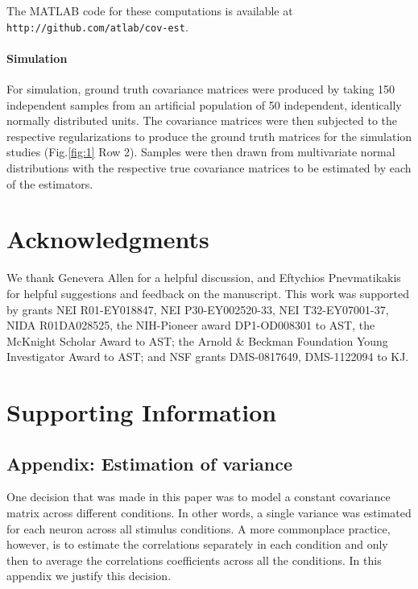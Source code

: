 \documentclass[10pt]{article}
\newcommand{\figref}[2]{Fig.\;\ref{fig:#1}\,#2}
\begin{document}
The MATLAB code for these computations is available at {\tt http://github.com/atlab/cov-est}.

\paragraph{Simulation}
For simulation, ground truth covariance matrices were produced by taking 150 independent samples from an artificial population of 50 independent, identically normally distributed units. The covariance matrices were then subjected to the respective regularizations to produce the ground truth matrices for the simulation studies (\figref{1}{\,Row 2}). Samples were then drawn from multivariate normal distributions with the respective true covariance matrices to be estimated by each of the estimators. 

\section*{Acknowledgments}
We thank Genevera Allen for a helpful discussion, and Eftychios Pnevmatikakis for helpful suggestions and feedback on the manuscript.  This work was supported by grants NEI R01-EY018847, NEI P30-EY002520-33, NEI T32-EY07001-37, NIDA R01DA028525, the NIH-Pioneer award DP1-OD008301 to AST, the McKnight Scholar Award to AST; the Arnold \& Beckman Foundation Young Investigator Award to AST; and NSF grants DMS-0817649, DMS-1122094 to KJ.



\newpage
\section*{Supporting Information}
\subsection*{Appendix: Estimation of variance}
One decision that was made in this paper was to model a constant covariance matrix across different conditions. In other words, a single variance was estimated for each neuron across all stimulus conditions. A more commonplace practice, however, is to estimate the correlations separately in each condition and only then to average the correlations coefficients across all the conditions. In this appendix we justify this decision.
\end{document}
